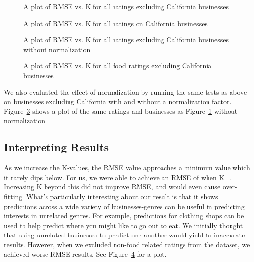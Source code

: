 \begin{figure}[ht!]
	\centering
	\caption[]{A plot of RMSE vs. K for all ratings excluding California businesses}
	\label{fig:nocal}
\end{figure}


\begin{figure}[ht!]
	\centering
	\caption[]{A plot of RMSE vs. K for all ratings on California businesses}
	\label{fig:cal}
\end{figure}

\begin{figure}[ht!]
	\centering
	\caption[]{A plot of RMSE vs. K for all ratings excluding California businesses without normalization}
	\label{fig:norm}
\end{figure}

\begin{figure}[ht!]
	\centering
	\caption[]{A plot of RMSE vs. K for all food ratings excluding California businesses}
	\label{fig:foodonly}
\end{figure}

We also evaluated the effect of normalization by running the same tests as above on businesses excluding California with and without a normalization factor. Figure~\ref{fig:norm} shows a plot of the same ratings and businesses as Figure~\ref{fig:nocal} without normalization.

\subsection{Interpreting Results}
As we increase the K-values, the RMSE value approaches a minimum value which it rarely dips below. For us, we were able to achieve an RMSE of \bestRMSE when K=\bestK. Increasing K beyond this did not improve RMSE, and would even cause over-fitting. What's particularly interesting about our result is that it shows predictions across a wide variety of businesses-genres can be useful in predicting interests in unrelated genres. For example, predictions for clothing shops can be used to help predict where you might like to go out to eat. We initially thought that using unrelated businesses to predict one another would yield to inaccurate results. However, when we excluded non-food related ratings from the dataset, we achieved worse RMSE results. See Figure~\ref{fig:foodonly} for a plot.


